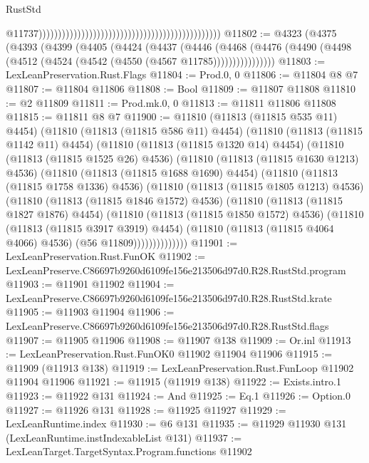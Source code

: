 \begin{lexlean}{RustStd}
\begin{coremodule}
                                                                                                  @11737)))))))))))))))))))))))))))))))))))))))))))))))
@11802 := @4323
    (@4375
      (@4393
        (@4399
          (@4405
            (@4424
              (@4437
                (@4446
                  (@4468
                    (@4476 (@4490 (@4498 (@4512 (@4524 (@4542 (@4550 (@4567 @11785))))))))))))))))
@11803 := LexLeanPreservation.Rust.Flags
@11804 := Prod.{0, 0}
@11806 := @11804 @8 @7
@11807 := @11804 @11806
@11808 := Bool
@11809 := @11807 @11808
@11810 := @2 @11809
@11811 := Prod.mk.{0, 0}
@11813 := @11811 @11806 @11808
@11815 := @11811 @8 @7
@11900 := @11810
    (@11813 (@11815 @535 @11) @4454)
    (@11810
      (@11813 (@11815 @586 @11) @4454)
      (@11810
        (@11813 (@11815 @1142 @11) @4454)
        (@11810
          (@11813 (@11815 @1320 @14) @4454)
          (@11810
            (@11813 (@11815 @1525 @26) @4536)
            (@11810
              (@11813 (@11815 @1630 @1213) @4536)
              (@11810
                (@11813 (@11815 @1688 @1690) @4454)
                (@11810
                  (@11813 (@11815 @1758 @1336) @4536)
                  (@11810
                    (@11813 (@11815 @1805 @1213) @4536)
                    (@11810
                      (@11813 (@11815 @1846 @1572) @4536)
                      (@11810
                        (@11813 (@11815 @1827 @1876) @4454)
                        (@11810
                          (@11813 (@11815 @1850 @1572) @4536)
                          (@11810
                            (@11813 (@11815 @3917 @3919) @4454)
                            (@11810 (@11813 (@11815 @4064 @4066) @4536) (@56 @11809))))))))))))))
@11901 := LexLeanPreservation.Rust.FunOK
@11902 := LexLeanPreserve.C86697b9260d6109fe156e213506d97d0.R28.RustStd.program
@11903 := @11901 @11902
@11904 := LexLeanPreserve.C86697b9260d6109fe156e213506d97d0.R28.RustStd.krate
@11905 := @11903 @11904
@11906 := LexLeanPreserve.C86697b9260d6109fe156e213506d97d0.R28.RustStd.flags
@11907 := @11905 @11906
@11908 := @11907 @138
@11909 := Or.inl
@11913 := LexLeanPreservation.Rust.FunOK0 @11902 @11904 @11906
@11915 := @11909 (@11913 @138)
@11919 := LexLeanPreservation.Rust.FunLoop @11902 @11904 @11906
@11921 := @11915 (@11919 @138)
@11922 := Exists.intro.{1}
@11923 := @11922 @131
@11924 := And
@11925 := Eq.{1}
@11926 := Option.{0}
@11927 := @11926 @131
@11928 := @11925 @11927
@11929 := LexLeanRuntime.index
@11930 := @6 @131
@11935 := @11929 @11930 @131 (LexLeanRuntime.instIndexableList @131)
@11937 := LexLeanTarget.TargetSyntax.Program.functions @11902

\end{coremodule}
\end{lexlean}
